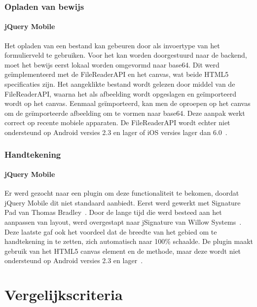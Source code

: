 \subsubsection{Opladen van bewijs}

\paragraph{jQuery Mobile} 
Het opladen van een bestand kan gebeuren door  als invoertype van het formulierveld te gebruiken. Voor het kan worden doorgestuurd naar de backend, moet het bewijs eerst lokaal worden omgevormd naar base64. Dit werd geïmplementeerd met de FileReaderAPI en het canvas, wat beide HTML5 specificaties zijn. Het aangeklikte bestand wordt gelezen door middel van de FileReaderAPI, waarna het als afbeelding wordt opgeslagen en geïmporteerd wordt op het canvas. Eenmaal geïmporteerd, kan men de  oproepen op het canvas om de geïmporteerde afbeelding om te vormen naar base64. Deze aanpak werkt correct op recente mobiele apparaten. De FileReaderAPI wordt echter niet ondersteund op Android versies 2.3 en lager of iOS versies lager dan 6.0~\cite{Deveria2013a}.

\subsubsection{Handtekening}

\paragraph{jQuery Mobile} 
Er werd gezocht naar een plugin om deze functionaliteit te bekomen, doordat jQuery Mobile dit niet standaard aanbiedt. Eerst werd gewerkt met Signature Pad van Thomas Bradley~\cite{Bradley2013}. Door de lange tijd die werd besteed aan het aanpassen van layout, werd overgestapt naar jSignature van Willow Systems~\cite{Systems2013}. Deze laatste gaf ook het voordeel dat de breedte van het gebied om te handtekening in te zetten, zich automatisch naar 100\% schaalde. De plugin maakt gebruik van het HTML5 canvas element en de  methode, maar deze wordt niet ondersteund op Android versies 2.3 en lager~\cite{Systems2013}.


\section{Vergelijkscriteria}
\label{sec:evaluatie-criteria}